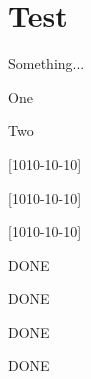 \documentclass[theme = draft]{../main/main}
\begin{document}
\section{Test}

\begin{tdocrem}
	Something...
\end{tdocrem}


\begin{tdocnote}
\begin{tdocnew}	
	\item One
	\item Two
\end{tdocnew}
\end{tdocnote}

[1010-10-10]

\bigskip

[1010-10-10]

\bigskip

[1010-10-10]

\bigskip
\bigskip
\bigskip

DONE

\bigskip

DONE

\bigskip

DONE

\bigskip

DONE
\end{document}
